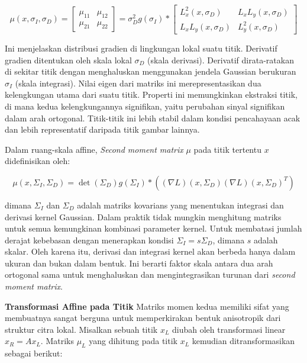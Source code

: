 \begin{equation}
  \mu(x,\sigma_{I},\sigma_{D})= 
  \begin{bmatrix}
   \mu_{11} & \mu_{12} \\
   \mu_{21} & \mu_{22} 
   \end{bmatrix} =
   \sigma^{2}_{D} g(\sigma_{I}) *
   \begin{bmatrix}
   L^{2}_{x}(x,\sigma_{D}) & L_{x}L_{y}(x,\sigma_{D}) \\
   L_{x}L_{y}(x,\sigma_{D}) & L^{2}_{y}(x,\sigma_{D}) 
   \end{bmatrix}
   \label{eq:SecondMomentMatrix}
\end{equation}

Ini menjelaskan distribusi gradien di lingkungan lokal suatu titik. Derivatif gradien ditentukan oleh skala lokal \(\sigma_{D}\) (skala derivasi). Derivatif dirata-ratakan di sekitar titik dengan menghaluskan menggunakan jendela Gaussian berukuran \(\sigma_{I}\) (skala integrasi). Nilai eigen dari matriks ini merepresentasikan dua kelengkungan utama dari suatu titik. Properti ini memungkinkan ekstraksi titik, di mana kedua kelengkungannya signifikan, yaitu perubahan sinyal signifikan dalam arah ortogonal. Titik-titik ini lebih stabil dalam kondisi pencahayaan acak dan lebih representatif daripada titik gambar lainnya.

Dalam ruang-skala affine, \emph{Second moment matrix} \(\mu\) pada titik tertentu \(x\) didefinisikan oleh:

\begin{equation*}
  \mu(x, \Sigma_{I}, \Sigma_{D} ) = \det(\Sigma_{D})g(\Sigma_{I})* ((\nabla L)(x, \Sigma_{D})(\nabla L)(x, \Sigma_{D})^{T})
\end{equation*}

dimana \(\Sigma_{I}\) dan \(\Sigma_{D}\) adalah matriks kovarians yang menentukan integrasi dan derivasi kernel Gaussian. Dalam praktik tidak mungkin menghitung matriks untuk semua kemungkinan kombinasi parameter kernel. Untuk membatasi jumlah derajat kebebasan dengan menerapkan kondisi \(\Sigma_{I} = s\Sigma_{D}\), dimana \(s\) adalah skalar. Oleh karena itu, derivasi dan integrasi kernel akan berbeda hanya dalam ukuran dan bukan dalam bentuk. Ini berarti faktor skala antara dua arah ortogonal sama untuk menghaluskan dan mengintegrasikan turunan dari \emph{second moment matrix}.

\textbf{Transformasi Affine pada Titik} Matriks momen kedua memiliki sifat yang membuatnya sangat berguna untuk memperkirakan bentuk anisotropik dari struktur citra lokal. Misalkan sebuah titik \(x_{L}\) diubah oleh transformasi linear \(x_{R} = Ax_{L}\). Matriks \(\mu_{L}\) yang dihitung pada titik \(x_{L}\) kemudian ditransformasikan sebagai berikut:

